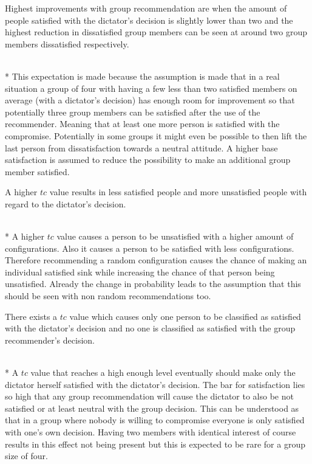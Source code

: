\begin{hypothesis}
    \begin{itshape}
        \label{hyp:Evaluation:MaximumMinimum} Highest improvements with group recommendation are when the amount of people satisfied with the dictator's decision is slightly lower than two and the highest reduction in dissatisfied group members can be seen at around two group members dissatisfied respectively.
    \end{itshape} \medskip \\*    
    This expectation is made because the assumption is made that in a real situation a group of four with having a few less than two satisfied members on average (with a dictator's decision) has enough room for improvement so that potentially three group members can be satisfied after the use of the recommender. Meaning that at least one more person is satisfied with the compromise. Potentially in some groups it might even be possible to then lift the last person from dissatisfaction towards a neutral attitude. A higher base satisfaction is assumed to reduce the possibility to make an additional group member satisfied.
\end{hypothesis}


\begin{hypothesis}
    \begin{itshape}
        \label{hyp:Evaluation:HigherTcLessSatisfied} A higher $tc$ value results in less satisfied people and more unsatisfied people with regard to the dictator's decision.
    \end{itshape} \medskip \\*
    A higher $tc$ value causes a person to be unsatisfied with a higher amount of configurations. Also it causes a person to be satisfied with less configurations. Therefore recommending a random configuration causes the chance of making an individual satisfied sink while increasing the chance of that person being unsatisfied. Already the change in probability leads to the assumption that this should be seen with non random recommendations too.
\end{hypothesis}

\begin{hypothesis}
    \begin{itshape}
        \label{hyp:Evaluation:OnlyOneSatisfied} There exists a $tc$ value which causes only one person to be classified as satisfied with the dictator's decision and no one is classified as satisfied with the group recommender's decision.
    \end{itshape} \medskip \\*
    A $tc$ value that reaches a high enough level eventually should make only the dictator herself satisfied with the dictator's decision. The bar for satisfaction lies so high that any group recommendation will cause the dictator to also be not satisfied or at least neutral with the group decision. This can be understood as that in a group where nobody is willing to compromise everyone is only satisfied with one's own decision. Having two members with identical interest of course results in this effect not being present but this is expected to be rare for a group size of four. 
\end{hypothesis}

